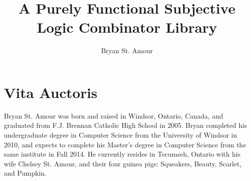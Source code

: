 \documentclass[oneside]{book}
\title{A Purely Functional Subjective Logic Combinator Library}
\author{Bryan St. Amour}
\begin{document}
\maketitle
\clearpage

\setcounter{page}{2}

\tableofcontents


\listoftables
\clearpage









\nocite{*} %



\chapter*{Vita Auctoris}

Bryan St. Amour was born and raised in Windsor, Ontario, Canada, and graduated from F.J. Brennan
Catholic High School in 2005. Bryan completed his undergraduate degree in Computer Science from
the University of Windsor in 2010, and expects to complete his Master's degree in Computer Science
from the same institute in Fall 2014. He currently resides in Tecumseh, Ontario with his wife
Chelsey St. Amour, and their four guinea pigs: Squeakers, Beauty, Scarlet, and Pumpkin.
\end{document}

